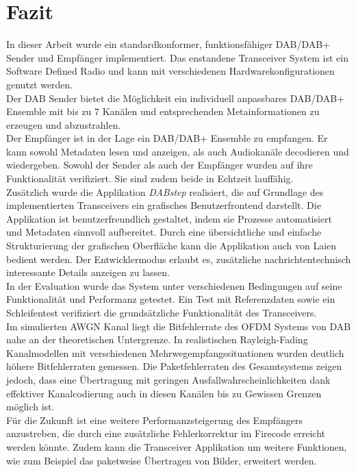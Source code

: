 \chapter{Fazit}\label{chapter:conclusion}
In dieser Arbeit wurde ein standardkonformer, funktionsfähiger DAB/DAB+ Sender und Empfänger implementiert. Das enstandene Transceiver System ist ein Software Defined Radio und kann mit verschiedenen Hardwarekonfigurationen genutzt werden.\\
Der DAB Sender bietet die Möglichkeit ein individuell anpassbares DAB/DAB+ Ensemble mit bis zu 7 Kanälen und entsprechenden Metainformationen zu erzeugen und abzustrahlen.\\
Der Empfänger ist in der Lage ein DAB/DAB+ Ensemble zu empfangen. Er kann sowohl Metadaten lesen und anzeigen, als auch Audiokanäle decodieren und wiedergeben.
Sowohl der Sender als auch der Empfänger wurden auf ihre Funktionalität verifiziert. Sie sind zudem beide in Echtzeit lauffähig.\\
Zusätzlich wurde die Applikation \textit{DABstep} realisiert, die auf Grundlage des implementierten Transceivers ein grafisches Benutzerfrontend darstellt. Die Applikation ist benutzerfreundlich gestaltet, indem sie Prozesse automatisiert und Metadaten sinnvoll aufbereitet. Durch eine übersichtliche und einfache Strukturierung der grafischen Oberfläche kann die Applikation auch von Laien bedient werden. Der Entwicklermodus erlaubt es, zusätzliche nachrichtentechnisch interessante Details anzeigen zu lassen.\\

In der Evaluation wurde das System unter verschiedenen Bedingungen auf seine Funktionalität und Performanz getestet. Ein Test mit Referenzdaten sowie ein Schleifentest verifiziert die grundsätzliche Funktionalität des Transceivers.\\
Im simulierten AWGN Kanal liegt die Bitfehlerrate des OFDM Systems von DAB nahe an der theoretischen Untergrenze. In realistischen Rayleigh-Fading Kanalmodellen mit verschiedenen Mehrwegempfangssituationen wurden deutlich höhere Bitfehlerraten gemessen. Die Paketfehlerraten des Gesamtsystems zeigen jedoch, dass eine Übertragung mit geringen Ausfallwahrscheinlichkeiten dank effektiver Kanalcodierung auch in diesen Kanälen bis zu Gewissen Grenzen möglich ist.\\
Für die Zukunft ist eine weitere Performanzsteigerung des Empfängers anzustreben, die durch eine zusätzliche Fehlerkorrektur im Firecode erreicht werden könnte. Zudem kann die Transceiver Applikation um weitere Funktionen, wie zum Beispiel das paketweise Übertragen von Bilder, erweitert werden.\\

